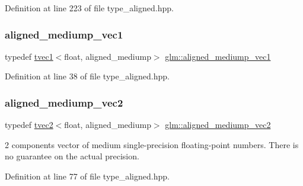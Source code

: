 Definition at line 223 of file type\+\_\+aligned.\+hpp.

\mbox{\label{group__gtc__type__aligned_ga5fbb1e478f8f47c5809f561368572927}} 
\subsubsection{\texorpdfstring{aligned\_mediump\_vec1}{aligned\_mediump\_vec1}}
{\footnotesize\ttfamily typedef \mbox{\hyperlink{structglm_1_1tvec1}{tvec1}}$<$float, aligned\+\_\+mediump$>$ \mbox{\hyperlink{group__gtc__type__aligned_ga5fbb1e478f8f47c5809f561368572927}{glm\+::aligned\+\_\+mediump\+\_\+vec1}}}



Definition at line 38 of file type\+\_\+aligned.\+hpp.

\mbox{\label{group__gtc__type__aligned_ga4bbaec6ecf4e72dfdb2ad83b3b8c49b8}} 
\subsubsection{\texorpdfstring{aligned\_mediump\_vec2}{aligned\_mediump\_vec2}}
{\footnotesize\ttfamily typedef \mbox{\hyperlink{structglm_1_1tvec2}{tvec2}}$<$float, aligned\+\_\+mediump$>$ \mbox{\hyperlink{group__gtc__type__aligned_ga4bbaec6ecf4e72dfdb2ad83b3b8c49b8}{glm\+::aligned\+\_\+mediump\+\_\+vec2}}}

2 components vector of medium single-\/precision floating-\/point numbers. There is no guarantee on the actual precision. 

Definition at line 77 of file type\+\_\+aligned.\+hpp.

\mbox{\label{group__gtc__type__aligned_ga26e1bf19f9506f2b36949687d927fe63}} 
